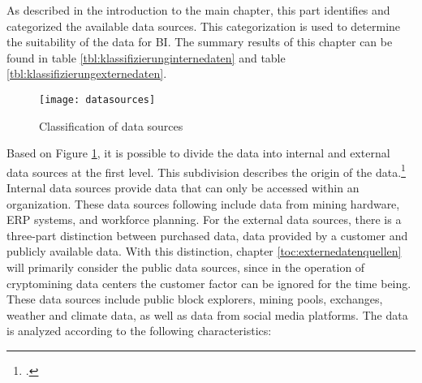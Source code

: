 As described in the introduction to the main chapter, this part identifies and
categorized the available data sources. This categorization is used to determine the suitability of the data for \ac{BI}. The summary results
of this chapter can be found in table \ref{tbl:klassifizierunginternedaten} and table \ref{tbl:klassifizierungexternedaten}.

\begin{figure}[H]
    \caption{Classification of data sources}
    \texttt{[image: datasources]}
    \label{figure:datasources}
    \\
    \cite[Source: Based on][Fig. 1]{hartmann2016capturing}
\end{figure}

Based on Figure \ref{figure:datasources}, it is possible to divide the data into internal and external data sources at the first level.
This subdivision describes the origin of the data.\footcite[Cf.][Fig. 1]{hartmann2016capturing}
Internal data sources provide data that can only be accessed within an organization. These
data sources following include data from mining hardware, \ac{ERP} systems, and workforce planning. For the external
data sources, there is a three-part distinction between purchased data, data provided by a customer
and publicly available data. With this distinction, chapter \ref{toc:externedatenquellen} will primarily consider the
public data sources, since in the operation of cryptomining data centers the customer factor can be ignored for the time being.
These data sources include public block explorers, mining pools, exchanges, weather and climate data, as well as
data from social media platforms. The data is analyzed according to the following characteristics:
